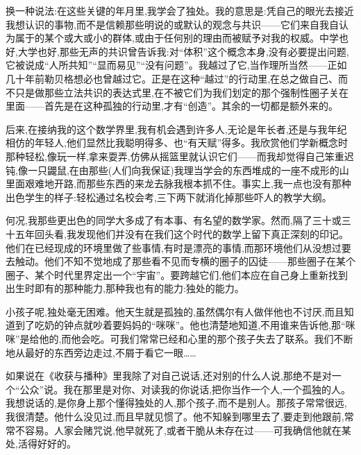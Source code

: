 换一种说法:在这些关键的年月里,我学会了独处。我的意思是:凭自己的眼光去接近我想认识的事物,而不是信赖那些明说的或默认的观念与共识——它们来自我自认为属于的某个或大或小的群体,或由于任何别的理由而被赋予对我的权威。中学也好,大学也好,那些无声的共识曾告诉我:对“体积”这个概念本身,没有必要提出问题,它被说成“人所共知”“显而易见”“没有问题”。我越过了它,当作理所当然——正如几十年前勒贝格想必也曾越过它。正是在这种“越过”的行动里,在总之做自己、而不只是做那些立法共识的表达式里,在不被它们为我们划定的那个强制性圈子关在里面——首先是在这种孤独的行动里,才有“创造”。其余的一切都是额外来的。

后来,在接纳我的这个数学界里,我有机会遇到许多人,无论是年长者,还是与我年纪相仿的年轻人,他们显然比我聪明得多、也“有天赋”得多。我欣赏他们学新概念时那种轻松,像玩一样,拿来耍弄,仿佛从摇篮里就认识它们——而我却觉得自己笨重迟钝,像一只鼹鼠,在由那些(人们向我保证)我理当学会的东西堆成的一座不成形的山里面艰难地开路,而那些东西的来龙去脉我根本抓不住。事实上,我一点也没有那种出色学生的样子:轻松通过名校会考,三下两下就消化掉那些吓人的教学大纲。

 何况,我那些更出色的同学大多成了有本事、有名望的数学家。然而,隔了三十或三十五年回头看,我发现他们并没有在我们这个时代的数学上留下真正深刻的印记。他们在已经现成的环境里做了些事情,有时是漂亮的事情,而那环境他们从没想过要去触动。他们不知不觉地成了那些看不见而专横的圈子的囚徒——那些圈子在某个圈子、某个时代里界定出一个“宇宙”。要跨越它们,他们本应在自己身上重新找到出生时即有的那种能力,那种我也有的能力:独处的能力。

小孩子呢,独处毫无困难。他天生就是孤独的,虽然偶尔有人做伴他也不讨厌,而且知道到了吃奶的钟点就吵着要妈妈的“咪咪”。他也清楚地知道,不用谁来告诉他,那“咪咪”是给他的,而他会吃。可我们常常已经和心里的那个孩子失去了联系。我们不断地从最好的东西旁边走过,不屑于看它一眼……

如果说在《收获与播种》里我除了对自己说话,还对别的什么人说,那绝不是对一个“公众”说。我在那里是对你、对读我的你说话,把你当作一个人,一个孤独的人。我想说话的,是你身上那个懂得独处的人,那个孩子,而不是别人。那孩子常常很远,我很清楚。他什么没见过,而且早就见惯了。他不知躲到哪里去了,要走到他跟前,常常不容易。人家会赌咒说,他早就死了,或者干脆从未存在过——可我确信他就在某处,活得好好的。

